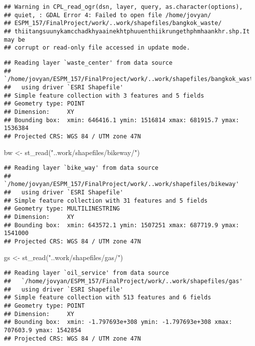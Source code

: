 \documentclass[
]{article}
\newenvironment{Shaded}{\begin{snugshade}}{\end{snugshade}}
\newcommand{\FunctionTok}[1]{\textcolor[rgb]{0.00,0.00,0.00}{#1}}
\newcommand{\NormalTok}[1]{#1}
\newcommand{\OtherTok}[1]{\textcolor[rgb]{0.56,0.35,0.01}{#1}}
\newcommand{\StringTok}[1]{\textcolor[rgb]{0.31,0.60,0.02}{#1}}
\begin{document}
\begin{verbatim}
## Warning in CPL_read_ogr(dsn, layer, query, as.character(options),
## quiet, : GDAL Error 4: Failed to open file /home/jovyan/
## ESPM_157/FinalProject/work/..work/shapefiles/bangkok_waste/
## thiitangsuunykamcchadkhyaainekhtphuuenthiikrungethphmhaankhr.shp.It may be
## corrupt or read-only file accessed in update mode.
\end{verbatim}

\begin{verbatim}
## Reading layer `waste_center' from data source 
##   `/home/jovyan/ESPM_157/FinalProject/work/..work/shapefiles/bangkok_waste' 
##   using driver `ESRI Shapefile'
## Simple feature collection with 3 features and 5 fields
## Geometry type: POINT
## Dimension:     XY
## Bounding box:  xmin: 646416.1 ymin: 1516814 xmax: 681915.7 ymax: 1536384
## Projected CRS: WGS 84 / UTM zone 47N
\end{verbatim}

\begin{Shaded}
\begin{Highlighting}[]
\NormalTok{bw }\OtherTok{\textless{}{-}} \FunctionTok{st\_read}\NormalTok{(}\StringTok{"..work/shapefiles/bikeway/"}\NormalTok{)}
\end{Highlighting}
\end{Shaded}

\begin{verbatim}
## Reading layer `bike_way' from data source 
##   `/home/jovyan/ESPM_157/FinalProject/work/..work/shapefiles/bikeway' 
##   using driver `ESRI Shapefile'
## Simple feature collection with 31 features and 5 fields
## Geometry type: MULTILINESTRING
## Dimension:     XY
## Bounding box:  xmin: 643572.1 ymin: 1507251 xmax: 687719.9 ymax: 1541000
## Projected CRS: WGS 84 / UTM zone 47N
\end{verbatim}

\begin{Shaded}
\begin{Highlighting}[]
\NormalTok{gs }\OtherTok{\textless{}{-}} \FunctionTok{st\_read}\NormalTok{(}\StringTok{"..work/shapefiles/gas/"}\NormalTok{)}
\end{Highlighting}
\end{Shaded}

\begin{verbatim}
## Reading layer `oil_service' from data source 
##   `/home/jovyan/ESPM_157/FinalProject/work/..work/shapefiles/gas' 
##   using driver `ESRI Shapefile'
## Simple feature collection with 513 features and 6 fields
## Geometry type: POINT
## Dimension:     XY
## Bounding box:  xmin: -1.797693e+308 ymin: -1.797693e+308 xmax: 707603.9 ymax: 1542854
## Projected CRS: WGS 84 / UTM zone 47N
\end{verbatim}
\end{document}
